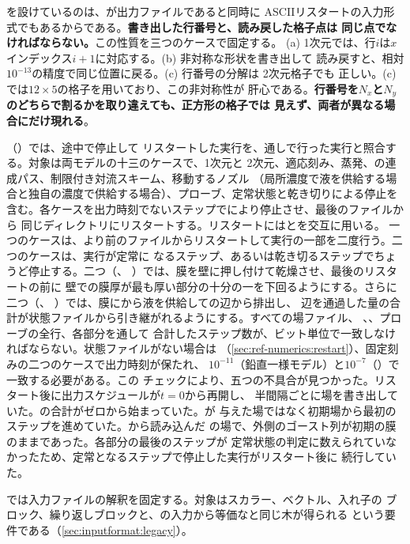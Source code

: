 を設けているのは、が出力ファイルであると同時に
ASCIIリスタートの入力形式でもあるからである。\textbf{書き出した行番号と、読み戻した格子点は
同じ点でなければならない。}この性質を三つのケースで固定する。
(a) 1次元では、行$i$は$x$インデックス$i+1$に対応する。(b) 非対称な形状を書き出して
読み戻すと、相対$10^{-13}$の精度で同じ位置に戻る。(c) 行番号の分解は 2次元格子でも
正しい。(c)では\textbf{$12 \times 5$}の格子を用いており、この非対称性が
肝心である。\textbf{行番号を$N_x$と$N_y$のどちらで割るかを取り違えても、正方形の格子では
見えず、両者が異なる場合にだけ現れる}。

（）では、途中で停止して
リスタートした実行を、通しで行った実行と照合する。対象は両モデルの十三のケースで、1次元と
2次元、適応刻み、蒸発、の連成パス、制限付き対流スキーム、移動するノズル
（局所濃度で液を供給する場合と独自の濃度で供給する場合）、プローブ、定常状態と乾き切りによる停止を
含む。各ケースを出力時刻でないステップでにより停止させ、最後のファイルから
同じディレクトリにリスタートする。リスタートにはとを交互に用いる。
一つのケースは、より前のファイルからリスタートして実行の一部を二度行う。二つのケースは、実行が定常に
なるステップ、あるいは乾き切るステップでちょうど停止する。二つ（、
）では、膜を壁に押し付けて乾燥させ、最後のリスタートの前に
壁での膜厚が最も厚い部分の十分の一を下回るようにする。さらに二つ（、
）では、膜にから液を供給しての辺から排出し、
辺を通過した量の合計が状態ファイルから引き継がれるようにする。すべての場ファイル、
、、プローブの全行、各部分を通して
合計したステップ数が、ビット単位で一致しなければならない。状態ファイルがない場合は
（\cref{sec:ref-numerics:restart}）、固定刻みの二つのケースで出力時刻が保たれ、
$10^{-11}$（鉛直一様モデル）と$10^{-7}$（）で一致する必要がある。この
チェックにより、五つの不具合が見つかった。リスタート後に出力スケジュールが$t = 0$から再開し、
半間隔ごとに場を書き出していた。の合計がゼロから始まっていた。が
与えた場ではなく初期場から最初のステップを進めていた。から読み込んだ
の場で、外側のゴースト列が初期の膜のままであった。各部分の最後のステップが
定常状態の判定に数えられていなかったため、定常となるステップで停止した実行がリスタート後に
続行していた。

では入力ファイルの解釈を固定する。対象はスカラー、ベクトル、入れ子の
ブロック、繰り返しブロックと、の入力から等価なと同じ木が得られる
という要件である（\cref{sec:inputformat:legacy}）。

